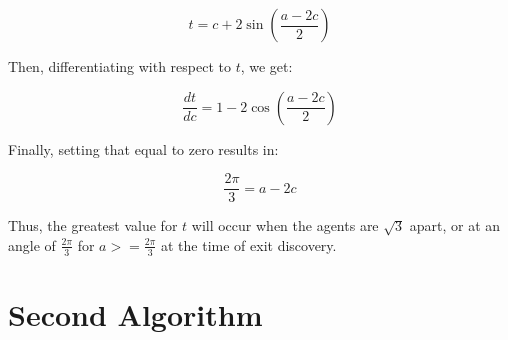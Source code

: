 \documentclass[11pt]{article}
\begin{document}
\begin{flushleft}
\[ t = c + 2 \sin (\frac{a - 2c}{2}) \]

\vspace*{5mm} Then, differentiating with respect to $t$, we get:

\[ \frac{dt}{dc} = 1 - 2 \cos (\frac{a - 2c}{2}) \]

\vspace*{5mm} Finally, setting that equal to zero results in:

\[ \frac{2\pi}{3} = a - 2c \]

\vspace*{5mm} Thus, the greatest value for $t$ will occur when the agents are $\sqrt{3}$ apart,
or at an angle of $ \frac{2\pi}{3}$ for $a >= \frac{2\pi}{3}$ at the time of exit discovery.



\end{flushleft}

\section {Second Algorithm}
\end{document}

